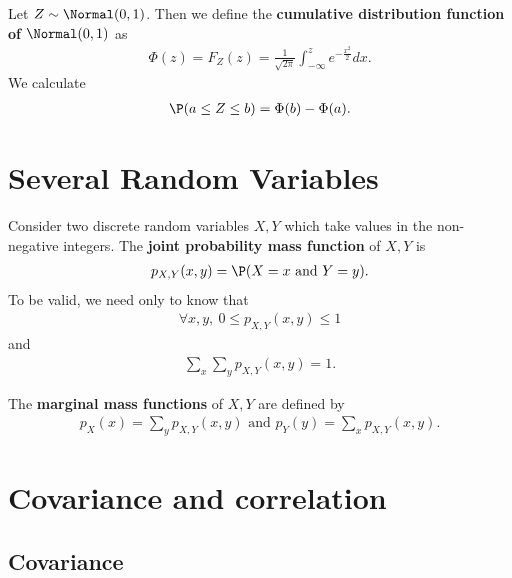 \documentclass{article}
\begin{document}
\begin{definition}
    Let $Z\sim\Normal(0,1)$. Then we define the \textbf{cumulative distribution
    function of $\Normal(0,1)$} as
    \begin{align*}
        \Phi(z)=F_Z(z) = \frac{1}{\sqrt{2\pi}}\int_{-\infty}^z e^{-\frac{x^2}{2}}dx. 
    \end{align*}
    We calculate
    \begin{align*}
        \P(a\leq Z\leq b) = \Phi(b)-\Phi(a).
    \end{align*}
\end{definition}


\section{Several Random Variables}


\begin{definition}
    Consider two discrete random variables $X,Y$ which take values in the non-negative
    integers. The \textbf{joint probability mass function} of $X,Y$ is
    \begin{align*}
        p_{X,Y} (x,y) = \P(X=x\text{ and } Y = y).
    \end{align*}
    To be valid, we need only to know that
    \begin{align*}
        \forall x,y,\: 0\leq p_{X,Y}(x,y) \leq 1 
    \end{align*}
    and
    \begin{align*}
        \sum_x \sum_y p_{X,Y}(x,y) = 1.
    \end{align*}
\end{definition}

\begin{definition}
    The \textbf{marginal mass functions} of $X,Y$ are defined by
    \begin{align*}
        p_X (x) = \sum_y p_{X,Y} (x,y) \text{ and } p_Y(y)=\sum_x p_{X,Y}(x,y).
    \end{align*}
\end{definition}


\section{Covariance and correlation}


\subsection{Covariance}
\end{document}
